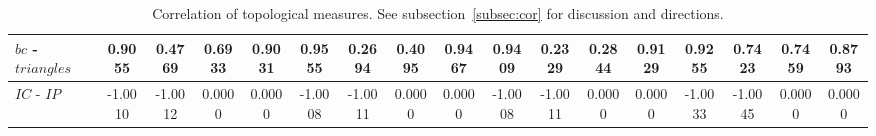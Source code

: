 \documentclass[%
 aip,
 jmp,%
 amsmath,amssymb,
 reprint,%
]{revtex4-1}
\begin{document}
\begin{table}
\begin{tabular}{|l|| c|c|c|c||  c|c|c|c||   c|c|c|c||   c|c|c|c|}
$bc$ - $triangles$ & 0.9055 & 0.4769 & 0.6933 & 0.9031 & 0.9555 & 0.2694 & 0.4095 & 0.9467 & 0.9409 & 0.2329 & 0.2844 & 0.9129 & 0.9255 & 0.7423 & 0.7459 & 0.8793 \\ \hline
$IC$ - $IP$ & -1.0010 & -1.0012 & 0.0000 & 0.0000 & -1.0008 & -1.0011 & 0.0000 & 0.0000 & -1.0008 & -1.0011 & 0.0000 & 0.0000 & -1.0033 & -1.0045 & 0.0000 & 0.0000 \\ \hline
  \end{tabular}
  \caption{Correlation of topological measures. See subsection~\ref{subsec:cor} for discussion and directions.}
  \label{tab:corTop}
\end{table}

\clearpage
\end{document}
